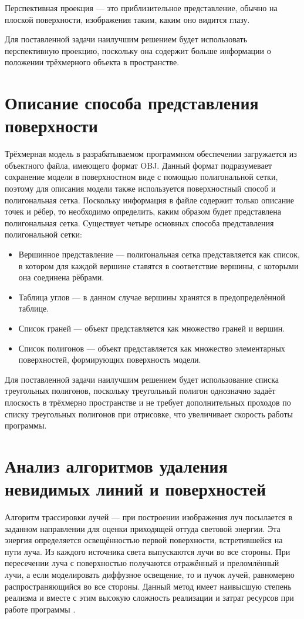 Перспективная проекция --- это приблизительное представление, обычно на плоской поверхности, изображения таким, каким оно видится глазу.

Для поставленной задачи наилучшим решением будет использовать перспективную проекцию, поскольку она содержит больше информации о положении трёхмерного объекта в пространстве.

\section{Описание способа представления поверхности}
Трёхмерная модель в разрабатываемом программном обеспечении загружается из объектного файла, имеющего формат OBJ. Данный формат подразумевает сохранение модели в поверхностном виде с помощью полигональной сетки, поэтому для описания модели также используется поверхностный способ и полигональная сетка. Поскольку информация в файле содержит только описание точек и рёбер, то необходимо определить, каким образом будет представлена полигональная сетка. Существует четыре основных способа представления полигональной сетки:
\begin{itemize}
    \item Вершинное представление — полигональная сетка представляется как список, в котором для каждой вершине ставятся в соответствие вершины, с которыми она соединена рёбрами.
    \item Таблица углов — в данном случае вершины хранятся в предопределённой таблице.
    \item Список граней — объект представляется как множество граней и вершин.
    \item Список полигонов — объект представляется как множество элементарных поверхностей, формирующих поверхность модели. 
\end{itemize}

Для поставленной задачи наилучшим решением будет использование списка треугольных полигонов, поскольку треугольный полигон однозначно задаёт плоскость в трёхмерно пространстве и не требует дополнительных проходов по списку треугольных полигонов при отрисовке, что увеличивает скорость работы программы.

\section{Анализ алгоритмов удаления невидимых линий и поверхностей}
Алгоритм трассировки лучей --- при построении изображения луч посылается в заданном направлении для оценки приходящей оттуда световой энергии. Эта энергия определяется освещённостью первой поверхности, встретившейся на пути луча. Из каждого источника света выпускаются лучи во все стороны. При пересечении луча с поверхностью получаются отражённый и преломлённый лучи, а если моделировать диффузное освещение, то и пучок лучей, равномерно распространяющийся во все стороны. Данный метод имеет наивысшую степень реализма и вместе с этим высокую сложность реализации и затрат ресурсов при работе программы \cite{cgshish}.

